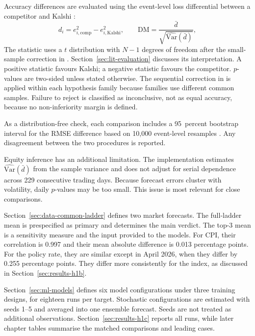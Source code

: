 \documentclass[12pt,a4paper]{report}
\begin{document}
Accuracy differences are evaluated using the event-level loss differential
between a competitor and Kalshi \parencite{diebold1995}:
\begin{equation}
d_i = e_{i,\mathrm{comp}}^{2} - e_{i,\mathrm{Kalshi}}^{2},
\qquad
\mathrm{DM} = \frac{\bar{d}}{\sqrt{\widehat{\mathrm{Var}}(\bar{d})}} ,
\label{eq:dm}
\end{equation}
The statistic uses a $t$ distribution with $N-1$ degrees of freedom after the
small-sample correction in \textcite{harvey1997}.
Section~\ref{sec:lit-evaluation} discusses its interpretation. A positive
statistic favours Kalshi; a negative statistic favours the competitor.
$p$-values are two-sided unless stated otherwise. The sequential correction in
\textcite{holm1979} is applied within each hypothesis family because families
use different common samples. Failure to reject is classified as inconclusive,
not as equal accuracy, because no non-inferiority margin is defined.

As a distribution-free check, each comparison includes a 95~percent bootstrap
interval for the RMSE difference based on 10{,}000 event-level resamples
\parencite{efron1979}. Any disagreement between the two procedures is reported.

Equity inference has an additional limitation. The implementation estimates
$\widehat{\mathrm{Var}}(\bar{d})$ from the sample variance and does not adjust
for serial dependence across 229 consecutive trading days. Because forecast
errors cluster with volatility, daily $p$-values may be too small. This issue
is most relevant for close comparisons.

Section~\ref{sec:data-common-ladder} defines two market forecasts. The
full-ladder mean is prespecified as primary and determines the main verdict.
The top-3 mean is a sensitivity measure and the input provided to the models.
For CPI, their correlation is 0.997 and their mean absolute difference is
0.013 percentage points. For the policy rate, they are similar except in April
2026, when they differ by 0.255 percentage points. They differ more consistently
for the index, as discussed in Section~\ref{sec:results-h1b}.

Section~\ref{sec:ml-models} defines six model configurations under three
training designs, for eighteen runs per target. Stochastic configurations are
estimated with seeds 1--5 and averaged into one ensemble forecast. Seeds are
not treated as additional observations. Section~\ref{sec:results-h1c} reports all runs, while later chapter tables
summarise the matched comparisons and leading cases.
\end{document}
